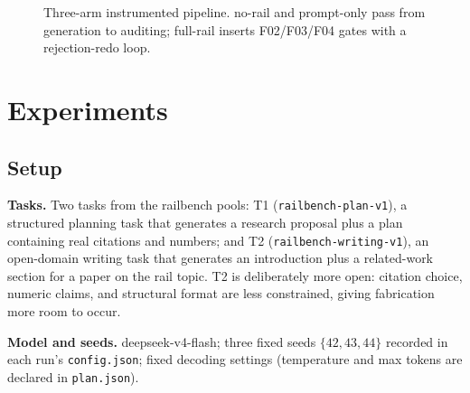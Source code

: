 \documentclass[10pt,twocolumn]{article}
\begin{document}
\begin{figure}[t]
\centering
{}
\caption{Three-arm instrumented pipeline. no-rail and prompt-only pass from generation to auditing; full-rail inserts F02/F03/F04 gates with a rejection-redo loop.}
\label{fig:pipeline}
\end{figure}

\section{Experiments}
\label{sec:exp}

\subsection{Setup}
\textbf{Tasks.} Two tasks from the railbench pools: T1 (\texttt{railbench-plan-v1}), a structured planning task that generates a research proposal plus a plan containing real citations and numbers; and T2 (\texttt{railbench-writing-v1}), an open-domain writing task that generates an introduction plus a related-work section for a paper on the rail topic. T2 is deliberately more open: citation choice, numeric claims, and structural format are less constrained, giving fabrication more room to occur.

\textbf{Model and seeds.} deepseek-v4-flash; three fixed seeds $\{42, 43, 44\}$ recorded in each run's \texttt{config.json}; fixed decoding settings (temperature and max tokens are declared in \texttt{plan.json}).
\end{document}
